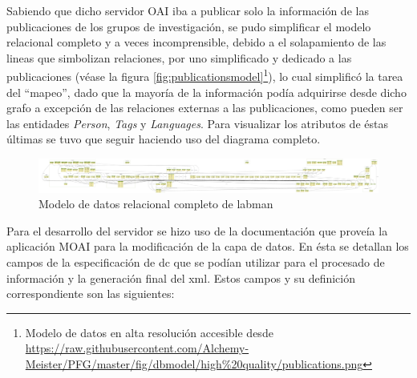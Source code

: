 Sabiendo que dicho servidor OAI iba a publicar solo la información de las publicaciones de los grupos de investigación, se pudo simplificar el modelo relacional completo y a veces incomprensible, debido a el solapamiento de las lineas que simbolizan relaciones, por uno simplificado y dedicado a las publicaciones (véase la figura \ref{fig:publicationsmodel}\footnote{Modelo de datos en alta resolución accesible desde \url{https://raw.githubusercontent.com/Alchemy-Meister/PFG/master/fig/dbmodel/high\%20quality/publications.png}}), lo cual simplificó la tarea del ``mapeo'', dado que la mayoría de la información podía adquirirse desde dicho grafo a excepción de las relaciones externas a las publicaciones, como pueden ser las entidades \textit{Person}, \textit{Tags} y \textit{Languages}. Para visualizar los atributos de éstas últimas se tuvo que seguir haciendo uso del diagrama completo.

\begin{figure}[!htbp]
	\centering
	\includegraphics[angle=90, scale=0.072]{fig/dbmodel/labman_model}
	\caption{Modelo de datos relacional completo de \acrshort{labman}}
	\label{fig:labmanmodel}
\end{figure}

Para el desarrollo del servidor se hizo uso de la documentación que proveía la aplicación MOAI para la modificación de la capa de datos. En ésta se detallan los campos de la especificación de \acrshort{dc} que se podían utilizar para el procesado de información y la generación final del \acrshort{xml}. Estos campos y su definición correspondiente son las siguientes:

